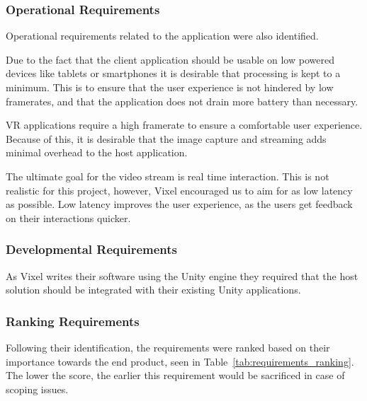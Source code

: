 \subsubsection{Operational Requirements}
Operational requirements related to the application were also identified.

Due to the fact that the client application should be usable on low powered devices like tablets or smartphones it is desirable that processing is kept to a minimum. This is to ensure that the user experience is not hindered by low framerates, and that the application does not drain more battery than necessary.

VR applications require a high framerate to ensure a comfortable user experience\cite{sony_high_fps}. Because of this, it is desirable that the image capture and streaming adds minimal overhead to the host application.

The ultimate goal for the video stream is real time interaction. This is not realistic for this project, however, Vixel encouraged us to aim for as low latency as possible. Low latency improves the user experience, as the users get feedback on their interactions quicker.

\subsubsection{Developmental Requirements}
As Vixel writes their software using the Unity engine they required that the host solution should be integrated with their existing Unity applications.

\subsubsection{Ranking Requirements}
Following their identification, the requirements were ranked based on their importance towards the end product, seen in Table~\ref{tab:requirements_ranking}. The lower the score, the earlier this requirement would be sacrificed in case of scoping issues.

